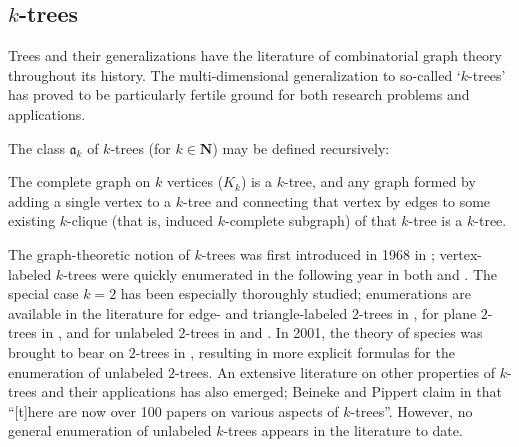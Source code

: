 \documentclass[sectionflow,singlespace,twoside,boldmathhdr,draft]{brandiss} %
\numberwithin{section}{chapter}
\numberwithin{figure}{chapter}
\begin{document}
\subsection{$k$-trees}\label{ss:ktrees}
Trees and their generalizations have the literature of combinatorial graph theory throughout its history.
The multi-dimensional generalization to so-called `$k$-trees' has proved to be particularly fertile ground for both research problems and applications.

The class $\mathfrak{a}_{k}$ of $k$-trees (for $k \in \mathbf{N}$) may be defined recursively:
\begin{definition}
  \label{def:ktree}
  The complete graph on $k$ vertices ($K_{k}$) is a $k$-tree, and any graph formed by adding a single vertex to a $k$-tree and connecting that vertex by edges to some existing $k$-clique (that is, induced $k$-complete subgraph) of that $k$-tree is a $k$-tree.
\end{definition}

The graph-theoretic notion of $k$-trees was first introduced in 1968 in \cite{harpalm:acycsimp}; vertex-labeled $k$-trees were quickly enumerated in the following year in both \cite{moon:lktrees} and \cite{beinpipp:lktrees}.
The special case $k=2$ has been especially thoroughly studied; enumerations are available in the literature for edge- and triangle-labeled $2$-trees in \cite{palm:l2trees}, for plane $2$-trees in \cite{palmread:p2trees}, and for unlabeled $2$-trees in \cite{harpalm:acycsimp} and \cite{harpalm:graphenum}.
In 2001, the theory of species was brought to bear on $2$-trees in \cite{gessel:spec2trees}, resulting in more explicit formulas for the enumeration of unlabeled $2$-trees.
An extensive literature on other properties of $k$-trees and their applications has also emerged; Beineke and Pippert claim in \cite{beinpipp:multidim} that ``[t]here are now over 100 papers on various aspects of $k$-trees''.
However, no general enumeration of unlabeled $k$-trees appears in the literature to date.
\end{document}
